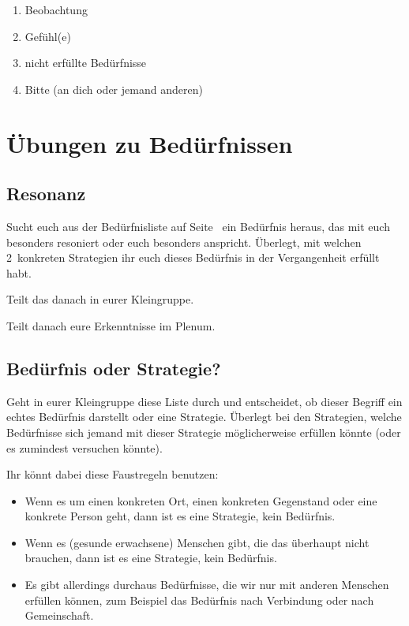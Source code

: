 \begin{enumerate}
  \item Beobachtung
  \item Gefühl(e)
  \item nicht erfüllte Bedürfnisse
  \item Bitte (an dich oder jemand anderen)
\end{enumerate}


\section{Übungen zu Bedürfnissen}


\subsection{Resonanz}

Sucht euch aus der Bedürfnisliste auf Seite~\pageref{beduerfnisse} ein Bedürfnis heraus, das mit euch besonders resoniert oder euch besonders anspricht. Überlegt, mit welchen 2~konkreten Strategien ihr euch dieses Bedürfnis in der Vergangenheit erfüllt habt.

Teilt das danach in eurer Kleingruppe.

Teilt danach eure Erkenntnisse im Plenum.


\subsection{Bedürfnis oder Strategie?}

Geht in eurer Kleingruppe diese Liste durch und entscheidet, ob dieser Begriff ein echtes Bedürfnis darstellt oder eine Strategie. Überlegt bei den Strategien, welche Bedürfnisse sich jemand mit dieser Strategie möglicherweise erfüllen könnte (oder es zumindest versuchen könnte).

Ihr könnt dabei diese Faustregeln benutzen:

\begin{itemize}
  \item Wenn es um einen konkreten Ort, einen konkreten Gegenstand oder eine konkrete Person geht, dann ist es eine Strategie, kein Bedürfnis.
  \item Wenn es (gesunde erwachsene) Menschen gibt, die das überhaupt nicht brauchen, dann ist es eine Strategie, kein Bedürfnis.
  \item Es gibt allerdings durchaus Bedürfnisse, die wir nur mit anderen Menschen erfüllen können, zum Beispiel das Bedürfnis nach Verbindung oder nach Gemeinschaft.
\end{itemize}

